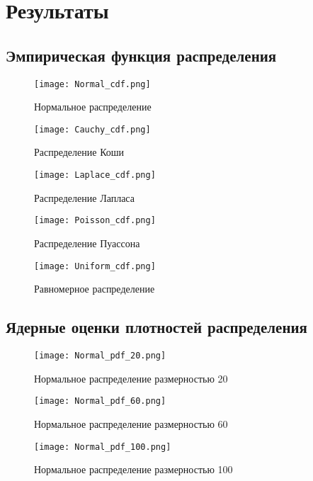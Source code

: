 \documentclass[12pt,a4paper]{article}
\begin{document}
\section {Результаты}
\subsection{Эмпирическая функция распределения}
\begin{figure}[H]
    \centering
    \texttt{[image: Normal\_cdf.png]}
    \caption{Нормальное распределение}
\end{figure}

\begin{figure}[H]
    \centering
    \texttt{[image: Cauchy\_cdf.png]}
    \caption{Распределение Коши}
\end{figure}

\begin{figure}[H]
    \centering
    \texttt{[image: Laplace\_cdf.png]}
    \caption{Распределение Лапласа}
\end{figure}

\begin{figure}[H]
    \centering
    \texttt{[image: Poisson\_cdf.png]}
    \caption{Распределение Пуассона}
\end{figure}

\begin{figure}[H]
    \centering
    \texttt{[image: Uniform\_cdf.png]}
    \caption{Равномерное распределение}
\end{figure}

\subsection{Ядерные оценки плотностей распределения}
\begin{figure}[H]
    \centering
    \texttt{[image: Normal\_pdf\_20.png]}
    \caption{Нормальное распределение размерностью 20}
\end{figure}

\begin{figure}[H]
    \centering
    \texttt{[image: Normal\_pdf\_60.png]}
    \caption{Нормальное распределение размерностью 60}
\end{figure}

\begin{figure}[H]
    \centering
    \texttt{[image: Normal\_pdf\_100.png]}
    \caption{Нормальное распределение размерностью 100}
\end{figure}
\end{document}
